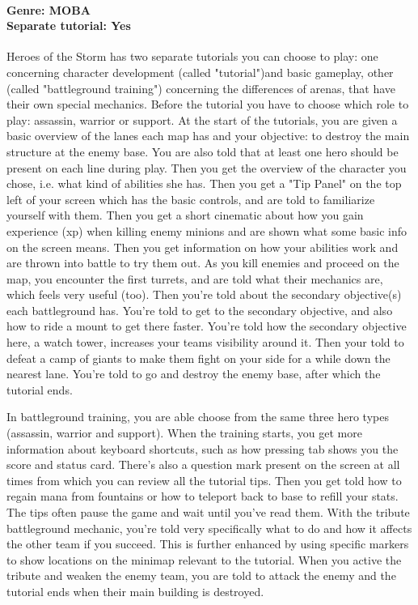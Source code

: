 \paragraph{Genre: MOBA \\ Separate tutorial: Yes \\}
Heroes of the Storm has two separate tutorials you can choose to play: one concerning character development (called "tutorial")and basic gameplay, other (called "battleground training") concerning the differences of arenas, that have their own special mechanics.
Before the tutorial you have to choose which role to play: assassin, warrior or support.
At the start of the tutorials, you are given a basic overview of the lanes each map has and your objective: to destroy the main structure at the enemy base. You are also told that at least one hero should be present on each line during play.
Then you get the overview of the character you chose, i.e. what kind of abilities she has.
Then you get a "Tip Panel" on the top left of your screen which has the basic controls, and are told to familiarize yourself with them.
Then you get a short cinematic about how you gain experience (xp) when killing enemy minions and are shown what some basic info on the screen means.
Then you get information on how your abilities work and are thrown into battle to try them out.
As you kill enemies and proceed on the map, you encounter the first turrets, and are told what their mechanics are, which feels very useful (too).
Then you're told about the secondary objective(s) each battleground has.
You're told to get to the secondary objective, and also how to ride a mount to get there faster.
You're told how the secondary objective here, a watch tower, increases your teams visibility around it.
Then your told to defeat a camp of giants to make them fight on your side for a while down the nearest lane.
You're told to go and destroy the enemy base, after which the tutorial ends.

In battleground training, you are able choose from the same three hero types (assassin, warrior and support).
When the training starts, you get more information about keyboard shortcuts, such as how pressing tab shows you the score and status card.
There's also a question mark present on the screen at all times from which you can review all the tutorial tips.
Then you get told how to regain mana from fountains or how to teleport back to base to refill your stats.
The tips often pause the game and wait until you've read them.
With the tribute battleground mechanic, you're told very specifically what to do and how it affects the other team if you succeed. This is further enhanced by using specific markers to show locations on the minimap relevant to the tutorial.
When you active the tribute and weaken the enemy team, you are told to attack the enemy and the tutorial ends when their main building is destroyed.

